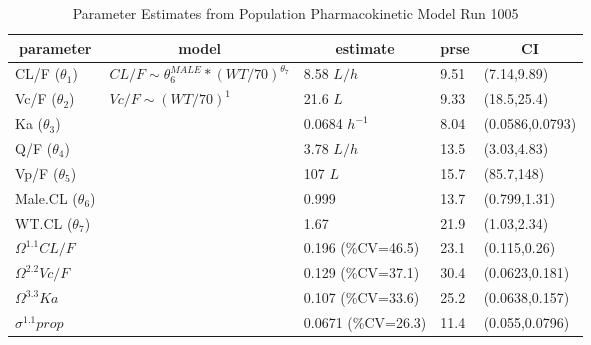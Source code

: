 \begin{table}[ht]
 \caption[Model 10o5 Parameters]{Parameter Estimates from Population Pharmacokinetic Model Run 1005\label{p1005}} 
 \begin{center}
 \begin{tabular}{lllll}\hline\hline
\multicolumn{1}{c}{parameter}&\multicolumn{1}{c}{model}&\multicolumn{1}{c}{estimate}&\multicolumn{1}{c}{prse}&\multicolumn{1}{c}{CI}\tabularnewline
\hline
CL/F ($\theta_1$)&$CL/F \sim \theta_6^{MALE} * (WT/70)^{\theta_7}$&8.58 $L/h$&9.51&(7.14,9.89)\tabularnewline
Vc/F ($\theta_2$)&$Vc/F \sim (WT/70)^{1}$&21.6 $L$&9.33&(18.5,25.4)\tabularnewline
Ka ($\theta_3$)&&0.0684 $h^{-1}$&8.04&(0.0586,0.0793)\tabularnewline
Q/F ($\theta_4$)&&3.78 $L/h$&13.5&(3.03,4.83)\tabularnewline
Vp/F ($\theta_5$)&&107 $L$&15.7&(85.7,148)\tabularnewline
Male.CL ($\theta_6$)&&0.999&13.7&(0.799,1.31)\tabularnewline
WT.CL ($\theta_7$)&&1.67&21.9&(1.03,2.34)\tabularnewline
$\Omega^{1.1}CL/F$&&0.196 (\%CV=46.5)&23.1&(0.115,0.26)\tabularnewline
$\Omega^{2.2}Vc/F$&&0.129 (\%CV=37.1)&30.4&(0.0623,0.181)\tabularnewline
$\Omega^{3.3}Ka$&&0.107 (\%CV=33.6)&25.2&(0.0638,0.157)\tabularnewline
$\sigma^{1.1}prop$&&0.0671 (\%CV=26.3)&11.4&(0.055,0.0796)\tabularnewline
\hline
\end{tabular}

\end{center}

\end{table}
